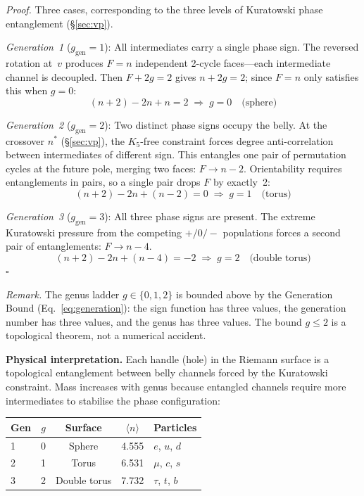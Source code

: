 \documentclass[aps,prd,twocolumn,superscriptaddress,nofootinbib,amsmath,amssymb,longbibliography]{revtex4-2}
\begin{document}
\emph{Proof.}
Three cases, corresponding to the three levels of Kuratowski phase
entanglement (\S\ref{sec:vp}).

\emph{Generation~1} ($g_{\mathrm{gen}} = 1$):
All intermediates carry a single phase sign.
The reversed rotation at~$v$ produces $F = n$ independent 2-cycle
faces---each intermediate channel is decoupled.
Then $F + 2g = 2$ gives $n + 2g = 2$; since $F = n$ only satisfies
this when $g = 0$:
\begin{equation}
  (n+2) - 2n + n = 2 \;\Rightarrow\; g = 0 \quad\text{(sphere)}
\end{equation}

\emph{Generation~2} ($g_{\mathrm{gen}} = 2$):
Two distinct phase signs occupy the belly.  At the crossover $n^*$
(\S\ref{sec:vp}), the $K_5$-free constraint forces degree
anti-correlation between intermediates of different sign.  This
entangles one pair of permutation cycles at the future pole, merging
two faces: $F \to n - 2$.  Orientability requires entanglements in
pairs, so a single pair drops $F$ by exactly~2:
\begin{equation}
  (n+2) - 2n + (n-2) = 0 \;\Rightarrow\; g = 1 \quad\text{(torus)}
\end{equation}

\emph{Generation~3} ($g_{\mathrm{gen}} = 3$):
All three phase signs are present.  The extreme Kuratowski pressure
from the competing $+/0/-$ populations forces a second pair of
entanglements: $F \to n - 4$.
\begin{equation}
  (n+2) - 2n + (n-4) = -2 \;\Rightarrow\; g = 2 \quad\text{(double torus)}
\end{equation}
$\square$

\emph{Remark.}
The genus ladder $g \in \{0, 1, 2\}$ is bounded above by the
Generation Bound (Eq.~\ref{eq:generation}): the sign function has
three values, the generation number has three values, and the genus has
three values.  The bound $g \leq 2$ is a topological theorem, not a
numerical accident.

\textbf{Physical interpretation.}
Each handle (hole) in the Riemann surface is a topological entanglement
between belly channels forced by the Kuratowski constraint.  Mass
increases with genus because entangled channels require more
intermediates to stabilise the phase configuration:
\begin{center}
\setlength{\tabcolsep}{4pt}
\begin{tabular}{@{}lcccl@{}}
\toprule
Gen & $g$ & Surface & $\langle n\rangle$ & Particles \\
\midrule
1 & 0 & Sphere & 4.555 & $e$, $u$, $d$ \\
2 & 1 & Torus  & 6.531 & $\mu$, $c$, $s$ \\
3 & 2 & Double torus & 7.732 & $\tau$, $t$, $b$ \\
\bottomrule
\end{tabular}
\end{center}
\end{document}
